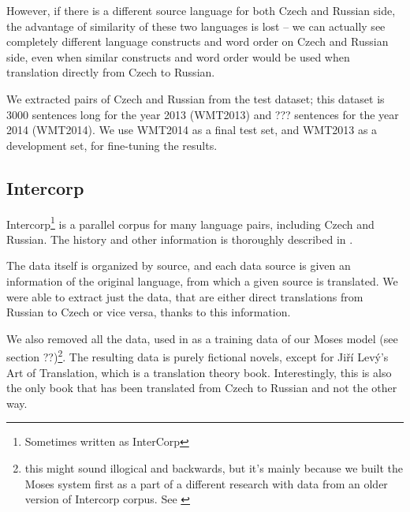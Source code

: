 However, if there is a different source language for both Czech and Russian side, the advantage of similarity of these two languages is lost -- we can actually see completely different language constructs and word order on Czech and Russian side, even when similar constructs and word order would be used when translation directly from Czech to Russian.

We extracted pairs of Czech and Russian from the test dataset; this dataset is 3000 sentences long for the year 2013 (WMT2013) and ??? sentences for the year 2014 (WMT2014). We use WMT2014 as a final test set, and WMT2013 as a development set, for fine-tuning the results.


\subsection{Intercorp}
\label{intercorp_p1}
Intercorp\footnote{Sometimes written as InterCorp} is a parallel corpus for many language pairs, including Czech and Russian. The history and other information is thoroughly described in \cite{intercorp}. 

The data itself is organized by source, and each data source is given an information of the original language, from which a given source is translated. We were able to extract just the data, that are either direct translations from Russian to Czech or vice versa, thanks to this information.

We also removed all the data, used in as a training data of our Moses model (see section ??)\footnote{this might sound illogical and backwards, but it's mainly because we built the Moses system first as a part of a different research with data from an older version of Intercorp corpus. See \cite{mujpaper}}. The resulting data is purely fictional novels, except for Jiří Levý's Art of Translation, which is a translation theory book. Interestingly, this is also the only book that has been translated from Czech to Russian and not the other way.

